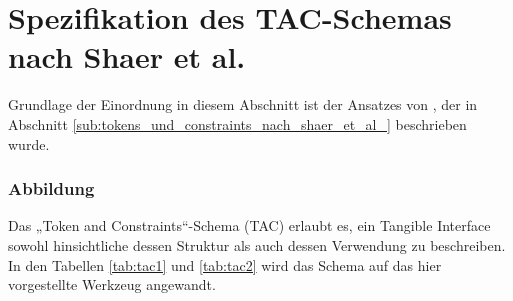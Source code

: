 
\section{Spezifikation des TAC-Schemas nach Shaer et al.} %
\label{sec:spezifikation_des_tac_schemas_nach_shaer_et_al_}

Grundlage der Einordnung in diesem Abschnitt ist der Ansatzes von \citet{Shaer04}, der in Abschnitt \ref{sub:tokens_und_constraints_nach_shaer_et_al_} beschrieben wurde.

\subsubsection{Abbildung}

Das „Token and Constraints“-Schema (\gls{TAC}) erlaubt es, ein Tangible Interface sowohl hinsichtliche dessen Struktur als auch dessen Verwendung zu beschreiben. In den Tabellen \ref{tab:tac1} und \ref{tab:tac2} wird das Schema auf das hier vorgestellte Werkzeug angewandt. 

